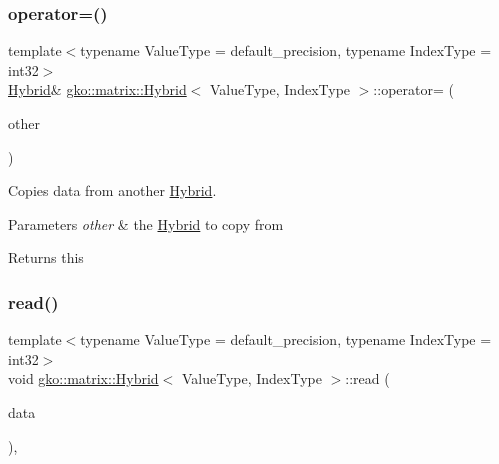 \subsubsection{\texorpdfstring{operator=()}{operator=()}}
{\footnotesize\ttfamily template$<$typename Value\+Type = default\+\_\+precision, typename Index\+Type = int32$>$ \\
\hyperlink{classgko_1_1matrix_1_1Hybrid}{Hybrid}\& \hyperlink{classgko_1_1matrix_1_1Hybrid}{gko\+::matrix\+::\+Hybrid}$<$ Value\+Type, Index\+Type $>$\+::operator= (\begin{DoxyParamCaption}\item[{const \hyperlink{classgko_1_1matrix_1_1Hybrid}{Hybrid}$<$ Value\+Type, Index\+Type $>$ \&}]{other }\end{DoxyParamCaption})\hspace{0.3cm}{\ttfamily [inline]}}



Copies data from another \hyperlink{classgko_1_1matrix_1_1Hybrid}{Hybrid}. 


\begin{DoxyParams}{Parameters}
{\em other} & the \hyperlink{classgko_1_1matrix_1_1Hybrid}{Hybrid} to copy from\\
\hline
\end{DoxyParams}
\begin{DoxyReturn}{Returns}
this 
\end{DoxyReturn}
\mbox{\label{classgko_1_1matrix_1_1Hybrid_a7eff2922ae21e9722b343ca1832d8bf5}} 
\subsubsection{\texorpdfstring{read()}{read()}}
{\footnotesize\ttfamily template$<$typename Value\+Type = default\+\_\+precision, typename Index\+Type = int32$>$ \\
void \hyperlink{classgko_1_1matrix_1_1Hybrid}{gko\+::matrix\+::\+Hybrid}$<$ Value\+Type, Index\+Type $>$\+::read (\begin{DoxyParamCaption}\item[{const \hyperlink{structgko_1_1matrix__data}{mat\+\_\+data} \&}]{data }\end{DoxyParamCaption})\hspace{0.3cm}{\ttfamily [override]}, {\ttfamily [virtual]}}



